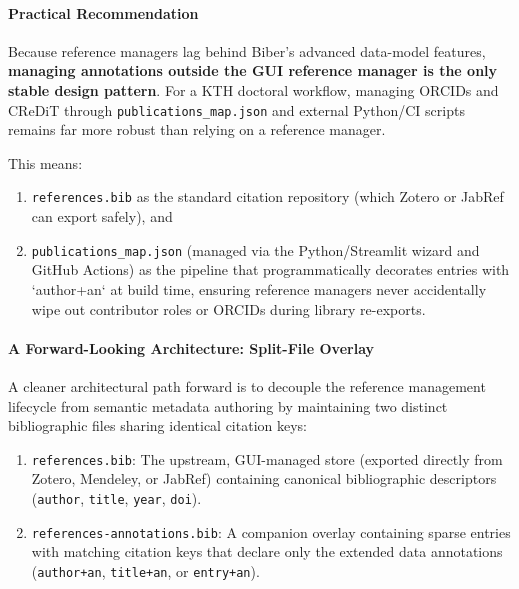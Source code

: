 \documentclass[12pt, twoside]{article}
\newcommand{\fname}[1]{\texttt{#1}}
\begin{document}
\paragraph{Practical Recommendation}\mbox{}\par
\smallskip

Because reference managers lag behind Biber’s advanced data-model features, \textbf{managing annotations outside the GUI reference manager is the only stable design pattern}. For a \gls{KTH} doctoral workflow, managing \glspl{ORCID} and \gls{CReDiT} through \fname{publications\_map.json} and external Python/\gls{CI} scripts remains far more robust than relying on a reference manager.

This means:
\begin{enumerate}
    \item \fname{references.bib} as the standard citation repository (which Zotero or JabRef can export safely), and
    \item \fname{publications\_map.json} (managed via the Python/Streamlit wizard and GitHub Actions) as the pipeline that programmatically decorates entries with `author+an` at build time, ensuring reference managers never accidentally wipe out contributor roles or \glspl{ORCID} during library re-exports.
\end{enumerate}

\paragraph{A Forward-Looking Architecture: Split-File Overlay}\mbox{}\par
\smallskip

A cleaner architectural path forward is to decouple the reference management lifecycle from semantic metadata authoring by maintaining two distinct bibliographic files sharing identical citation keys:
\begin{enumerate}
\item \fname{references.bib}: The upstream, GUI-managed store (exported directly from Zotero, Mendeley, or JabRef) containing canonical bibliographic descriptors (\eg \texttt{author}, \texttt{title}, \texttt{year}, \texttt{doi}).

\item \fname{references-annotations.bib}: A companion overlay containing sparse entries with matching citation keys that declare only the extended data annotations (\eg \texttt{author+an}, \texttt{title+an}, or \texttt{entry+an}).
\end{enumerate}
\end{document}
